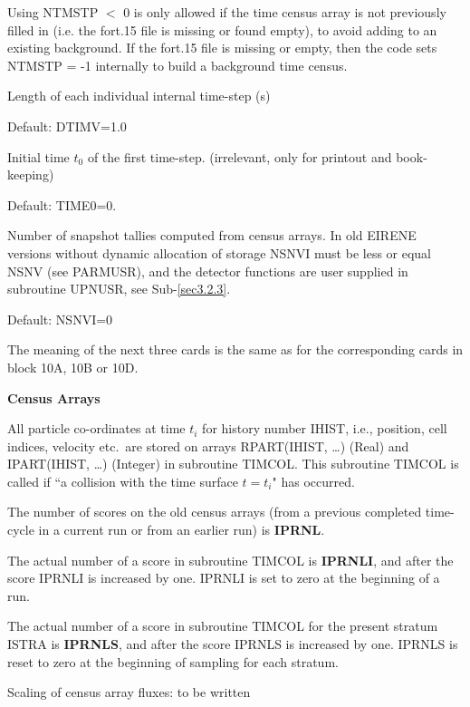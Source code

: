 \begin{description}
        Using NTMSTP $<$ 0 is only allowed if the time census array is not previously filled in (i.e. the fort.15 file is missing or found empty), to avoid adding to an existing background.
        If the fort.15 file is missing or empty, then the code sets NTMSTP = -1 internally to build a background time census.
  \item[DTIMV] Length of each individual internal time-step (\si{\second})

        Default: DTIMV=1.0

  \item[TIME0] Initial time $t_0$ of the first time-step.
        (irrelevant, only for printout and book-keeping)

        Default: TIME0=0.

  \item[NSNVI] Number of snapshot tallies computed from census arrays.
        In old EIRENE versions without dynamic allocation of storage NSNVI must be less
        or equal NSNV (see PARMUSR), and the detector functions are user supplied in
        subroutine UPNUSR, see Sub-\cref{sec3.2.3}.

        Default: NSNVI=0

\end{description}
The meaning of the next three cards is the same as for the
corresponding cards in block 10A, 10B or 10D.

\bigskip
\textbf{Census Arrays}

All particle co-ordinates at time $t_i$ for history number IHIST, i.e.,
position, cell indices, velocity etc.\ are stored on arrays RPART(IHIST, \dots)
(Real) and IPART(IHIST, \dots) (Integer) in subroutine TIMCOL.
This subroutine TIMCOL is called if ``a collision with the time surface
$t=t_i$" has occurred.

The number of scores on the old census arrays (from a previous completed
time-cycle in a current run or from an earlier run) is \textbf{IPRNL}.

The actual number of a score in subroutine TIMCOL is \textbf{IPRNLI}, and after
the score IPRNLI is increased by one.
IPRNLI is set to zero at the beginning of a run.

The actual number of a score in subroutine TIMCOL for the present stratum ISTRA
is \textbf{IPRNLS}, and after the score IPRNLS is increased by one.
IPRNLS is reset to zero at the beginning of sampling for each stratum.

Scaling of census array fluxes:   to be written
